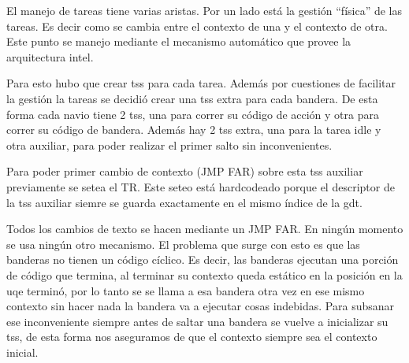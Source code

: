 	El manejo de tareas tiene varias aristas. Por un lado está
la gestión ``física'' de las tareas. Es decir como se cambia entre el contexto
de una y el contexto de otra. Este punto se manejo mediante el mecanismo
automático que provee la arquitectura intel.

	Para esto hubo que crear tss para cada tarea. Además por cuestiones
de facilitar la gestión la tareas se decidió crear una tss extra para cada
bandera. De esta forma cada navio tiene 2 tss, una para correr su código
de acción y otra para correr su código de bandera. Además hay 2 tss
extra, una para la tarea idle y otra auxiliar, para poder realizar
el primer salto sin inconvenientes.

	Para poder primer cambio de contexto (JMP FAR) sobre esta
tss auxiliar previamente se setea el TR. Este seteo está hardcodeado
porque el descriptor de la tss auxiliar siemre se guarda exactamente
en el mismo índice de la gdt.

	Todos los cambios de texto se hacen mediante un JMP FAR. En ningún
momento se usa ningún otro mecanismo. El problema que surge con
esto es que las banderas no tienen un código cíclico. Es decir, las banderas
ejecutan una porción de código que termina, al terminar su contexto queda
estático en la posición en la uqe terminó, por lo tanto se se llama a esa bandera
otra vez en ese mismo contexto sin hacer nada la bandera va a ejecutar 
cosas indebidas. Para subsanar ese inconveniente siempre antes de saltar una
bandera se vuelve a inicializar su tss, de esta forma nos aseguramos de que el contexto
siempre sea el contexto inicial.

	
